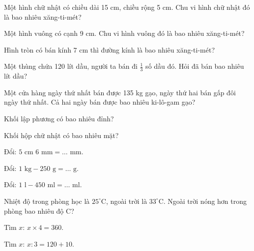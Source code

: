 \begin{ex}
Một hình chữ nhật có chiều dài 15 cm, chiều rộng 5 cm. Chu vi hình chữ nhật đó là bao nhiêu xăng-ti-mét?
\end{ex}

\begin{ex}
Một hình vuông có cạnh 9 cm. Chu vi hình vuông đó là bao nhiêu xăng-ti-mét?
\end{ex}

\begin{ex}
Hình tròn có bán kính 7 cm thì đường kính là bao nhiêu xăng-ti-mét?
\end{ex}

\begin{ex}
Một thùng chứa 120 lít dầu, người ta bán đi $\frac{1}{3}$ số dầu đó. Hỏi đã bán bao nhiêu lít dầu?
\end{ex}

\begin{ex}
Một cửa hàng ngày thứ nhất bán được 135 kg gạo, ngày thứ hai bán gấp đôi ngày thứ nhất. Cả hai ngày bán được bao nhiêu ki-lô-gam gạo?
\end{ex}

\begin{ex}
Khối lập phương có bao nhiêu đỉnh?
\end{ex}

\begin{ex}
Khối hộp chữ nhật có bao nhiêu mặt?
\end{ex}

\begin{ex}
Đổi: $5\text{ cm } 6\text{ mm} = \dots\text{ mm}$.
\end{ex}

\begin{ex}
Đổi: $1\text{ kg} - 250\text{ g} = \dots\text{ g}$.
\end{ex}

\begin{ex}
Đổi: $1\text{ l} - 450\text{ ml} = \dots\text{ ml}$.
\end{ex}

\begin{ex}
Nhiệt độ trong phòng học là $25^\circ$C, ngoài trời là $33^\circ$C. Ngoài trời nóng hơn trong phòng bao nhiêu độ C?
\end{ex}

\begin{ex}
Tìm $x$: $x \times 4 = 360$.
\end{ex}

\begin{ex}
Tìm $x$: $x : 3 = 120 + 10$.
\end{ex}
